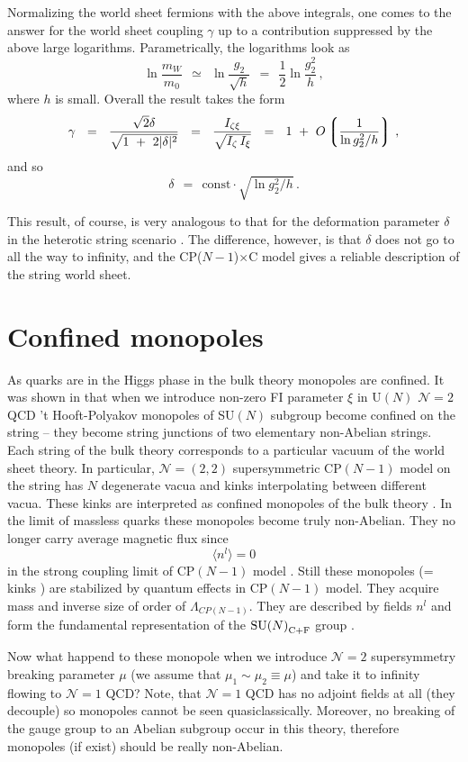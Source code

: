 \documentclass[12pt]{article}
\def\beq{\begin{equation}}
\def\eeq{\end{equation}}
\newcommand{\ntwo}{${\mathcal N}=2$ }
\newcommand{\ntwot}{${\mathcal N}= \left(2,2\right) $ }
\newcommand{\none}{${\mathcal N}=1$ }
\newcommand{\lgr}{\left\lgroup}
\newcommand{\rgr}{\right\rgroup}
\def\cfl {$\text{SU($N$)}_{\rm C+F}$ }
\newcommand{\CPC}{CP($N-1$)$\times$C }
\begin{document}
Normalizing the world sheet fermions with the above integrals, one comes to the answer
for the world sheet coupling $ \gamma $ up to a contribution suppressed by the above large logarithms.
Parametrically, the logarithms look as
\[
	\ln \frac{m_W}{m_0}  ~~\simeq~~ 
			\ln \frac{g_2}{\sqrt{h}} ~~=~~ \frac12 \ln \frac{g_2^2}{h}\,,
\]
where $ h $ is small.
Overall the result takes the form
\[
	\gamma ~~=~~ \frac{\sqrt{2}\delta}{\sqrt{1 ~+~ 2|\delta|^2}} ~~=~~ 
		\frac{I_{\zeta\xi}}{\sqrt{I_\zeta\, I_\xi}}  ~~=~~
			1 ~+~ O\lgr \frac{1}{\ln g_2^2/h } \rgr\,,
\]
and so
\beq
\label{deltaresult}
	\delta ~~=~~ \text{const}\cdot \sqrt{\ln g_2^2/h}\,.
\eeq

This result, of course, is very analogous to that for the deformation parameter $ \delta $ 
in the heterotic string scenario \cite{SYhet,BSYhet}. 
The difference, however, is that $ \delta $ does not go to all the way to infinity, and the \CPC model 
gives a reliable description of the string world sheet. 




\section{Confined monopoles}
\setcounter{equation}{0}

As quarks are in the Higgs phase in the bulk theory monopoles are confined. It was shown in
\cite{Tong,SYmon,HT2} that when we introduce non-zero FI parameter $\xi$  
in U$(N)$ \ntwo QCD  't Hooft-Polyakov monopoles of SU$(N)$ subgroup become confined on the string -- they become string junctions of two elementary non-Abelian strings. Each string of the bulk theory corresponds to a particular vacuum of the world sheet theory. In particular, \ntwot supersymmetric CP$(N-1)$ model on the string 
has $N$ degenerate vacua and kinks interpolating between different vacua. These kinks are interpreted as 
confined monopoles of the bulk theory \cite{Tong,SYmon,HT2}. In the limit of massless quarks
these monopoles become truly non-Abelian. They no longer carry average magnetic flux since
\beq
\langle n^l\rangle =0
\eeq
in the strong coupling limit of CP$(N-1)$ model . Still these monopoles (= kinks 
 ) are stabilized by  quantum effects in CP$(N-1)$ model. 
They acquire mass and inverse size of order of $\Lambda_{CP(N-1)}$. They 
are described by fields $n^l$ and form the fundamental representation of the \cfl group \cite{W79}.

Now what happend to these monopole when we introduce \ntwo supersymmetry breaking parameter
$\mu$ (we assume that $\mu_1\sim\mu_2\equiv\mu$) and take it to infinity flowing to \none QCD? Note, that \none QCD has no adjoint
fields at all (they decouple) so monopoles cannot be seen quasiclassically. Moreover, no breaking of the gauge
group to an Abelian subgroup occur in this theory, therefore monopoles (if exist) should be really
non-Abelian.
\end{document}
